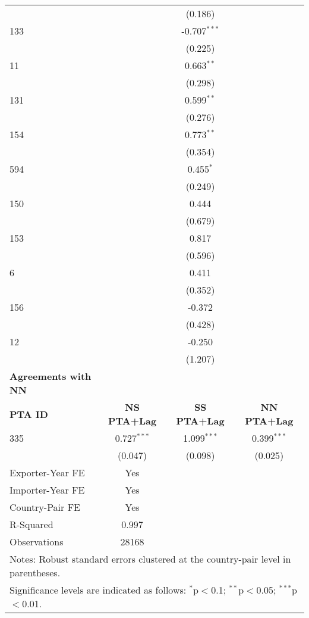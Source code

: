 \begin{center}
\begin{longtable}{lccc}
    &  & (0.186) &  \\
    133 &  & -0.707$^{\ast\ast\ast}$ &  \\
    &  & (0.225) &  \\
    11  &  & 0.663$^{\ast\ast}$ &  \\
    &  & (0.298) &  \\
    131  &  & 0.599$^{\ast\ast}$ &  \\
    &  & (0.276) &  \\
    154  &  & 0.773$^{\ast\ast}$ &  \\
    &  & (0.354) &  \\
    594  &  & 0.455$^{\ast}$ &  \\
    &  & (0.249) &  \\
    150 &  & 0.444 &  \\
    &  & (0.679) &  \\
    153 &  & 0.817 &  \\
    &  & (0.596) &  \\
    6   &  & 0.411 &  \\
    &  & (0.352) &  \\
    156   &  & -0.372 &  \\
    &  & (0.428) &  \\
    12   &  & -0.250 &  \\
    &  & (1.207) &  \\
    \hline
    \textbf{Agreements with NN} &  &  &  \\
    \hline
    \textbf{PTA ID} & \textbf{NS PTA+Lag} & \textbf{SS PTA+Lag} & \textbf{NN PTA+Lag} \\
    \hline
    335 & 0.727$^{\ast\ast\ast}$ & 1.099$^{\ast\ast\ast}$ & 0.399$^{\ast\ast\ast}$ \\
    & (0.047) & (0.098) & (0.025) \\
    \hline
    Exporter-Year FE & Yes \\
    Importer-Year FE & Yes \\
    Country-Pair FE & Yes \\
    R-Squared & 0.997 \\
    Observations & 28168 \\
    \hline
    \multicolumn{4}{l}{\footnotesize{Notes: Robust standard errors clustered at the country-pair level in parentheses.}} \\
    \multicolumn{4}{l}{\footnotesize{Significance levels are indicated as follows: $^{\ast}$p$<$0.1; $^{\ast\ast}$p$<$0.05; $^{\ast\ast\ast}$p$<$0.01.}} \\
\end{longtable}
\end{center}


